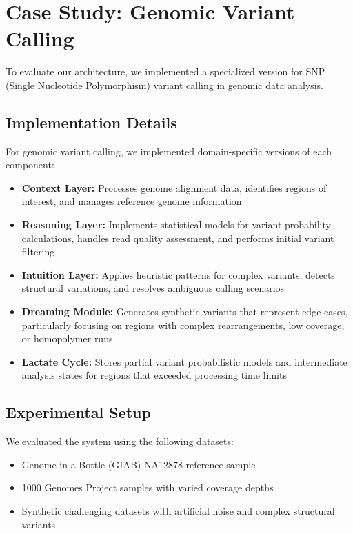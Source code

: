 \documentclass[11pt,a4paper,twocolumn]{article}
\begin{document}
\section{Case Study: Genomic Variant Calling}

To evaluate our architecture, we implemented a specialized version for SNP (Single Nucleotide Polymorphism) variant calling in genomic data analysis.

\subsection{Implementation Details}
For genomic variant calling, we implemented domain-specific versions of each component:

\begin{itemize}
    \item \textbf{Context Layer:} Processes genome alignment data, identifies regions of interest, and manages reference genome information
    \item \textbf{Reasoning Layer:} Implements statistical models for variant probability calculations, handles read quality assessment, and performs initial variant filtering
    \item \textbf{Intuition Layer:} Applies heuristic patterns for complex variants, detects structural variations, and resolves ambiguous calling scenarios
    \item \textbf{Dreaming Module:} Generates synthetic variants that represent edge cases, particularly focusing on regions with complex rearrangements, low coverage, or homopolymer runs
    \item \textbf{Lactate Cycle:} Stores partial variant probabilistic models and intermediate analysis states for regions that exceeded processing time limits
\end{itemize}

\subsection{Experimental Setup}
We evaluated the system using the following datasets:

\begin{itemize}
    \item Genome in a Bottle (GIAB) NA12878 reference sample
    \item 1000 Genomes Project samples with varied coverage depths
    \item Synthetic challenging datasets with artificial noise and complex structural variants
\end{itemize}
\end{document}
